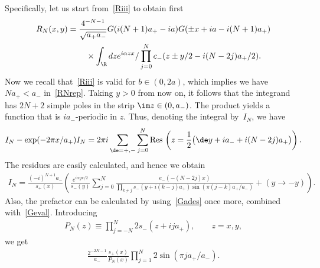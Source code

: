 \documentclass[pdftex]{sigma}
\numberwithin{equation}{section}
\begin{document}
Specif\/ically, let us start from~\eqref{Riii} to obtain f\/irst
\begin{gather}
R_N(x,y)    =   \frac{4^{-N-1}}{\sqrt{a_+a_-}}G(i(N+1)a_+-ia)
G(\pm x +ia-i(N+1)a_+)
\nonumber \\
\phantom{R_N(x,y)    =}{} \times
\int_{\R}dze^{i\alpha zx}/\prod_{j=0}^Nc_-(z\pm y/2-i(N-2j)a_+/2).\label{RNrep}
\end{gather}
Now we recall that~\eqref{Riii} is valid for $b\in(0,2a)$, which implies we have $Na_+<a_-$ in~\eqref{RNrep}. Taking $y>0$ from now on, it follows that the integrand has $2N+2$ simple poles in the strip $\im z\in(0,a_-)$. The product yields a function that is $ia_-$-periodic in $z$. Thus, denoting the integral by~$I_N$, we have
\begin{gather}
I_N-\exp(-2\pi x/a_+)I_N=2\pi i\sum_{\de=+,-}\sum_{j=0}^N {\rm Res}\, \left(z=\frac{1}{2}\big(\de y +ia_-+i(N-2j)a_+\big)\right).
\end{gather}
The residues are easily calculated, and hence we obtain
\begin{gather}\label{IN}
I_N=\frac{(-i)^{N+1}a_-}{s_+(x)}\!\left( \frac{e^{i\alpha yx/2}}{s_-(y)}\!
\sum_{j=0}^N\frac{e_-(-(N{-}2j)x)}{\prod\limits_{k\ne j}s_-(y{+}i(k{-}j)a_+)\sin(\pi(j-k)a_+/a_-)}{+}(y{\to} -y)\!\right).\!\!\!
\end{gather}
Also, the prefactor can be calculated by using~\eqref{Gades} once more, combined with~\eqref{Geval}. Introducing
\begin{gather}\label{PN}
P_N(z)\equiv \prod_{j=-N}^N 2s_-(z+ija_+),\qquad z=x,y,
\end{gather}
we get
\begin{gather}\label{pref}
\frac{2^{-2N-1}}{a_-}\frac{s_+(x)}{P_N(x)}\prod_{j=1}^N 2\sin(\pi ja_+/a_-).
\end{gather}
\end{document}
